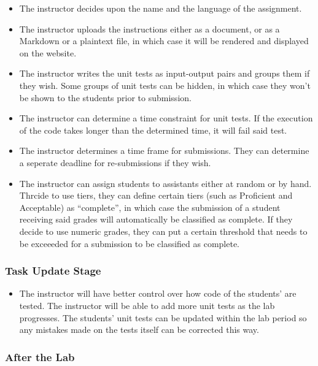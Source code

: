 \documentclass[a4paper, 12pt]{article}
\begin{document}
    \begin{itemize}
        \item The instructor decides upon the name and the language of the assignment.
        \item The instructor uploads the instructions either as a document, or as a Markdown
          or a plaintext file, in which case it will be rendered and displayed on the website.
        \item The instructor writes the unit tests as input-output pairs and groups them if
          they wish. Some groups of unit tests can be hidden, in which case they won't be
          shown to the students prior to submission.
        \item The instructor can determine a time constraint for unit tests. If the execution
          of the code takes longer than the determined time, it will fail said test.
        \item The instructor determines a time frame for submissions. They can determine a
          seperate deadline for re-submissions if they wish.
        \item The instructor can assign students to assistants either at random or by hand.
          Thrcide to use tiers, they can define certain tiers (such as Proficient and Acceptable) as ``complete'',
          in which case the submission of a student receiving said grades will automatically be classified as complete.
          If they decide to use numeric grades, they can put a certain threshold that needs to be exceeeded for a
          submission to be classified as complete.
    \end{itemize}

    \subsubsection{Task Update Stage}

    \begin{itemize}
        \item The instructor will have better control over how code of the students' are tested.
        The instructor will be able to add more unit tests as the lab progresses.
        The students' unit tests can be updated within the lab period so any mistakes made
        on the tests itself can be corrected this way.
    \end{itemize}

    \subsubsection{After the Lab}
\end{document}
